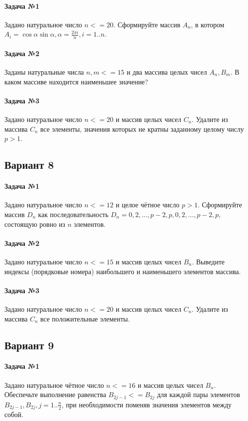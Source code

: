 \documentclass[12pt,a4paper]{report}
\begin{document}
\paragraph*{Задача №1}
Задано натуральное число $n <= 20$. Сформируйте массив $A_n$, в котором $A_i = \cos \alpha \sin \alpha, \alpha = \frac {2\pi i} {n}, i=1..n$.
\paragraph*{Задача №2}
Заданы натуральные числа $n, m <= 15$ и два массива целых чисел $A_n, B_m$. В каком массиве находится наименьшее значение?
\paragraph*{Задача №3}
Задано натуральное число $n <= 20$ и массив целых чисел $C_n$. Удалите из массива $C_n$ все элементы, значения которых не кратны заданному целому числу $p > 1$.


\subsection*{Вариант 8}
\paragraph*{Задача №1}
Задано натуральное число $n <= 12$ и целое чётное число $p > 1$. Сформируйте массив $D_n$ как последовательность $D_n = 0, 2, ..., p-2, p, 0, 2, ..., p-2, p$, состоящую ровно из $n$ элементов.
\paragraph*{Задача №2}
Задано натуральное число $n <= 15$ и массив целых чисел $B_n$. Выведите индексы (порядковые номера) наибольшего и наименьшего элементов массива.
\paragraph*{Задача №3}
Задано натуральное число $n <= 20$ и массив целых чисел $C_n$. Удалите из массива $C_n$ все положительные элементы.


\clearpage
\subsection*{Вариант 9}
\paragraph*{Задача №1}
Задано натуральное чётное число $n <= 16$ и массив целых чисел $B_n$. Обеспечьте выполнение равенства $B_{2j-1} <= B_{2j}$ для каждой пары элементов $B_{2j-1}, B_{2j}, j=1..\frac{n}{2}$, при необходимости поменяв значения элементов между собой.
\end{document}
